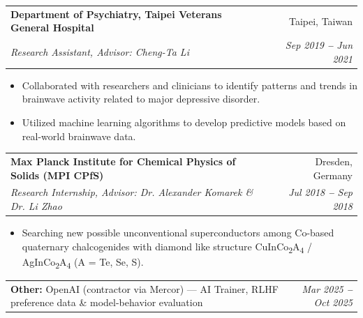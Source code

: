 \documentclass[letterpaper,10pt]{article}
\makeatletter
\newif\ifindustry
\newcommand{\resumeItem}[1]{
  \item\small{
    {#1 \vspace{-2pt}}
  }
}
\newcommand{\resumeSubheading}[4]{
  \vspace{-2pt}\item
    \begin{tabular*}{0.97\textwidth}[t]{l@{\extracolsep{\fill}}r}
      \textbf{#1} & #2 \\
      \textit{\small#3} & \textit{\small #4} \\
    \end{tabular*}\vspace{-7pt}
}
\newcommand{\resumeProjectHeading}[2]{
    \vspace{-2pt}\item
    \begin{tabular*}{0.97\textwidth}{l@{\extracolsep{\fill}}r}
      \small#1 & #2 \\
    \end{tabular*}\vspace{-7pt}
}
\newcommand{\resumeItemListStart}{\begin{itemize}}
\newcommand{\resumeItemListEnd}{\end{itemize}\vspace{-5pt}}
\makeatother
\begin{document}
    \resumeSubheading
      {Department of Psychiatry, Taipei Veterans General Hospital}{Taipei, Taiwan}
      {Research Assistant, Advisor: \ifindustry Prof.\ Cheng-Ta Li, MD\else \ProfDr{} Cheng-Ta Li \fi}{Sep 2019 \textbf{--} Jun 2021}
        \resumeItemListStart
\ifindustry
            \resumeItem{Built ML models on clinical EEG from major-depressive-disorder patients to predict treatment response; the model (M.S. thesis work) is in routine outpatient use at Taipei VGH's Precision Depression Intervention Center.}
\else
            \resumeItem{Collaborated with researchers and clinicians to identify patterns and trends in brainwave activity related to major depressive disorder.}
            \resumeItem{Utilized machine learning algorithms to develop predictive models based on real-world brainwave data.}
\fi
        \resumeItemListEnd  

    


\ifindustry\else
    \resumeSubheading
      {Max Planck Institute for Chemical Physics of Solids (MPI CPfS)}{Dresden, Germany}
     {Research Internship, Advisor: Dr. Alexander Komarek \& Dr. Li Zhao }{Jul 2018 \textbf{--} Sep 2018}
        \resumeItemListStart
            \resumeItem{Searching new possible unconventional superconductors  among Co-based quaternary chalcogenides with diamond like structure CuInCo\textsubscript{2}A\textsubscript{4} / AgInCo\textsubscript{2}A\textsubscript{4} (A = Te, Se, S).}

        \resumeItemListEnd
\fi

    \resumeProjectHeading
      {\textbf{Other:} OpenAI (contractor via Mercor) --- AI Trainer, RLHF preference data \& model-behavior evaluation}{\textit{\small Mar 2025 \textbf{--} Oct 2025}}
\ifindustry
    \vspace{-6pt}
    \resumeProjectHeading
      {\textbf{Earlier:} NTU Hospital Surgery (surgical-video detection); Max Planck Institute CPfS, Dresden (intern)}{\textit{\small 2018 \textbf{--} 2021}}
\fi
\end{document}
